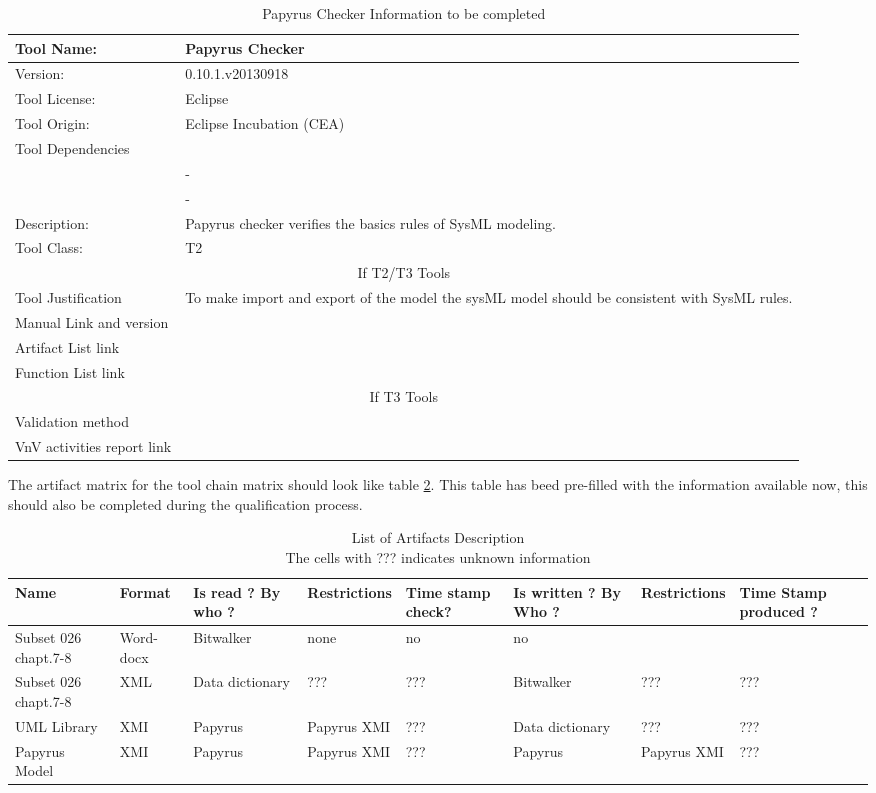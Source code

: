 \begin{table}[htbp]
\centering
\caption{\label{tbl:papyrusCheck-info} Papyrus Checker Information to be completed}
\begin{tabular}{|l|p{5cm}|}\hline
Tool Name: & Papyrus Checker \\\hline
Version: &  0.10.1.v20130918 \\\hline
Tool License: & Eclipse \\\hline
Tool Origin: &  Eclipse Incubation (CEA)\\\hline
Tool Dependencies & \\
 & -\\
 & -\\ \hline
Description: & Papyrus checker verifies the basics rules of SysML modeling. \\ \hline
Tool Class: & T2\\\hline
\multicolumn{2}{|c|}{If T2/T3 Tools}\\\hline
Tool Justification & To make import and export of the model the sysML
model should be consistent with SysML rules.\\ \hline
Manual Link and version & \\\hline
Artifact List link & \\\hline
Function List link& \\\hline
\multicolumn{2}{|c|}{If T3 Tools}\\\hline
Validation method& \\\hline
VnV activities report link&\\\hline
\end{tabular}
\end{table}

The artifact matrix for the tool chain matrix should look like
table \ref{tbl:example-artifacts}.
This table has beed pre-filled with the information available now,
this should also be completed during the qualification process.

\begin{table}[htbp]
\caption{\label{tbl:example-artifacts} List of  Artifacts Description\\ The
cells with ??? indicates unknown information\\ }
{\small
\begin{tabular}{|p{4em}|l|p{1.5cm}|l|p{5em}|p{1.8cm}|l|p{5em}|}\hline
Name & Format & Is read ? By who ?& Restrictions & Time stamp check? &Is
written ? By Who ?& Restrictions & Time Stamp produced ?\\\hline
Subset 026 chapt.7-8 & Word-docx & Bitwalker & none & no & no &
&\\\hline
Subset 026 chapt.7-8 & XML  & 
Data dictionary &  ??? & ??? & Bitwalker & ??? & ??? \\\hline
UML Library & XMI & Papyrus & Papyrus XMI & ??? & Data dictionary &
??? & ??? \\\hline 
Papyrus Model & XMI & Papyrus & Papyrus XMI & ??? & Papyrus &
 Papyrus XMI & ??? \\\hline 

\end{tabular}

}
\end{table}

